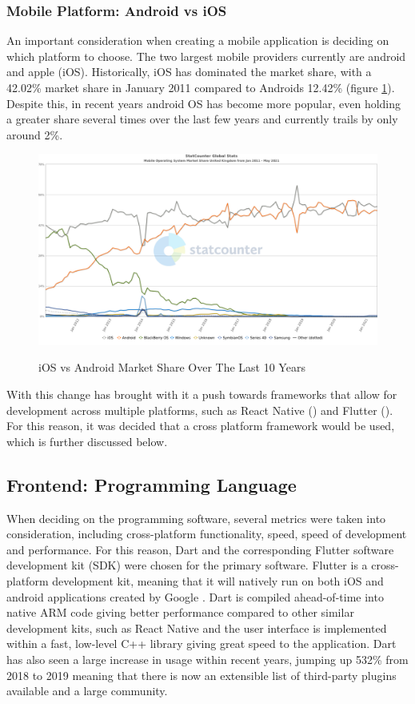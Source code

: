 \documentclass[12pt]{article}
\begin{document}
	
	\subsubsection{Mobile Platform: Android vs iOS}
	An important consideration when creating a mobile application is deciding on which platform to choose. The two largest mobile providers currently are android and apple (iOS). Historically, iOS has dominated the market share, with a 42.02\% market share in January 2011 compared to Androids 12.42\% (figure \ref{fig:ios-android}). Despite this, in recent years android OS has become more popular, even holding a greater share several times over the last few years and currently trails by only around 2\%.
	
	\begin{figure}[H]
		\centering
		\includegraphics[scale=0.4]{images/ios-android.png}
		\caption{iOS vs Android Market Share Over The Last 10 Years}
		\label{fig:ios-android}
		\cite{AndroidVsIOS2021}
	\end{figure}
	
	With this change has brought with it a push towards frameworks that allow for development across multiple platforms, such as React Native (\cite{ReactNativeLearn}) and Flutter (\cite{FlutterBeautifulNative}). For this reason, it was decided that a cross platform framework would be used, which is further discussed below.
	
	\subsection{Frontend: Programming Language}
	When deciding on the programming software, several metrics were taken into consideration, including cross-platform functionality, speed, speed of development and performance. For this reason, Dart and the corresponding Flutter software development kit (SDK) were chosen for the primary software. Flutter is a cross-platform development kit, meaning that it will natively run on both iOS and android applications created by Google \cite{FlutterBeautifulNative}. Dart is compiled ahead-of-time into native ARM code giving better performance compared to other similar development kits, such as React Native and the user interface  is implemented within a fast, low-level C++ library giving great speed to the application. Dart has also seen a large increase in usage within recent years, jumping up 532\% from 2018 to 2019 \cite{StateOctoverse2019} meaning that there is now an extensible list of third-party plugins available and a large community.
	
\end{document}
